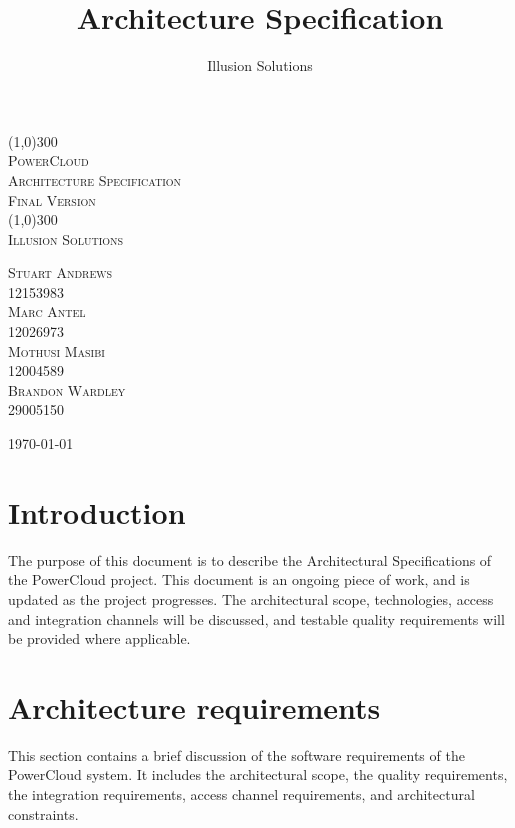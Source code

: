 \documentclass{article}
\title{
	Architecture Specification
}
\author{Illusion Solutions}
\begin{document}
	
	\begin{titlepage}
		\begin{center}
			\line(1,0){300} \\
			[0.1cm]
			\textsc{\Huge
				PowerCloud\\
				Architecture Specification
			} \\
			\textsc{\large Final Version}\\
			[0.1cm]
			\line(1,0){300} \\
			[2.0cm]
			\textsc{\Large
				Illusion Solutions
			} \\
			[3.5cm]
			
		\end{center}
		\begin{flushright}
			\textsc{\Large
				Stuart Andrews\\ 
				12153983\\
				Marc Antel\\
				12026973\\
				Mothusi Masibi\\
				12004589\\
				Brandon Wardley\\
				29005150\\
				[4.0cm]
			}
		\end{flushright}
		\begin{center}
			\today
		\end{center}
	\end{titlepage}

\newpage
\restoregeometry
\tableofcontents
\thispagestyle{empty}

\newpage

\section{Introduction}

The purpose of this document is to describe the Architectural 
Specifications of the PowerCloud project. This document is an ongoing 
piece of work, and is updated as the project progresses. The 
architectural scope, technologies, access and integration channels will 
be discussed, and testable quality requirements will be provided where 
applicable.

\section{Architecture requirements}

This section contains a brief discussion of the software requirements of 
the PowerCloud system. It includes the architectural scope, the quality 
requirements, the integration requirements, access channel requirements, 
and architectural constraints.
\end{document}
